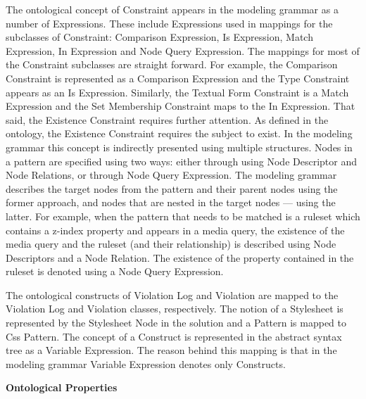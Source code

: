 The ontological concept of Constraint appears in the modeling grammar as a number of Expressions.
These include Expressions used in mappings for the subclasses of Constraint: Comparison Expression,
Is Expression, Match Expression, In Expression and Node Query Expression. The mappings for most of
the Constraint subclasses are straight forward. For example, the Comparison Constraint is
represented as a Comparison Expression and the Type Constraint appears as an Is Expression.
Similarly, the Textual Form Constraint is a Match Expression and the Set Membership Constraint maps
to the In Expression. That said, the Existence Constraint requires further attention. As defined in
the ontology, the Existence Constraint requires the subject to exist. In the modeling grammar this
concept is indirectly presented using multiple structures. Nodes in a pattern are specified using
two ways: either through using Node Descriptor and Node Relations, or through Node Query Expression.
The modeling grammar describes the target nodes from the pattern and their parent nodes using the
former approach, and nodes that are nested in the target nodes --- using the latter. For example,
when the pattern that needs to be matched is a ruleset which contains a z-index property and appears
in a media query, the existence of the media query and the ruleset (and their relationship) is
described using Node Descriptors and a Node Relation. The existence of the property contained in the
ruleset is denoted using a Node Query Expression.

The ontological constructs of Violation Log and Violation are mapped to the Violation Log and
Violation classes, respectively. The notion of a Stylesheet is represented by the Stylesheet Node in
the solution and a Pattern is mapped to Css Pattern. The concept of a Construct is represented in
the abstract syntax tree as a Variable Expression. The reason behind this mapping is that in the
modeling grammar Variable Expression denotes only Constructs.

\textbf{Ontological Properties}

